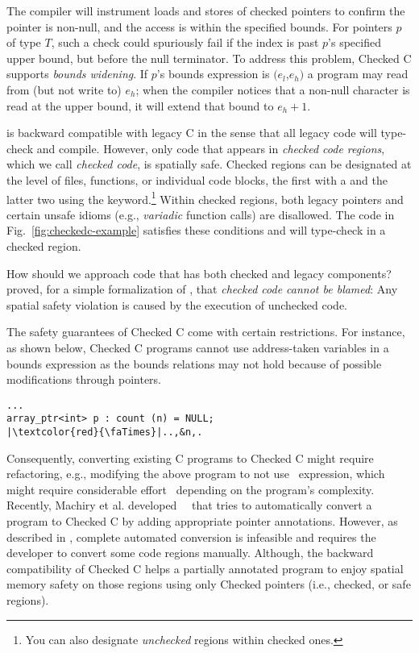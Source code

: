The \checkedc compiler will instrument loads and stores of checked
pointers to confirm the pointer is non-null, and the access is within
the specified bounds. For pointers $p$ of type
$T$\code{>}, such a check could spuriously fail if
the index is past $p$'s specified upper bound, but before the null
terminator. To address this problem, Checked C supports \emph{bounds
  widening}.
If $p$'s bounds expression is $(e_l$,$e_h)$ a program may read from (but not
write to) $e_h$; when the compiler notices that a non-null character
is read at the upper bound, it will extend that bound to $e_h+1$.

%
\checkedc is backward compatible with legacy C in the sense that all
legacy code will type-check and compile. However, only code that
appears in \emph{checked code regions}, which we call \emph{checked code},
is spatially safe. Checked regions can be designated at the level of
files, functions, or individual code blocks, the first with a
 and the latter two using the 
keyword.\footnote{You can also designate \emph{unchecked} regions
  within checked ones.}  Within checked regions, both
legacy pointers and certain unsafe idioms (e.g., \emph{variadic} function
calls) are disallowed. The code in Fig.~\ref{fig:checkedc-example}
satisfies these conditions and will type-check in a checked region.

How should we approach code that has both checked and legacy
components? \citet{li22checkedc} proved, for a simple
formalization of \checkedc, that \emph{checked code cannot be blamed}:
Any spatial safety violation is caused by the execution of unchecked
code. 

%
The safety guarantees of Checked C come with certain restrictions. For instance, as shown below, Checked C programs cannot use address-taken variables in a bounds expression as the bounds relations may not hold because of possible modifications through pointers.
\begin{verbatim}
...
array_ptr<int> p : count (n) = NULL;
|\textcolor{red}{\faTimes}|..,&n,.
\end{verbatim}
Consequently, converting existing C programs to Checked C might require refactoring, e.g., modifying the above program to not use~ expression, which might require considerable effort~\cite{duanrefactoring} depending on the program's complexity. 
Recently, Machiry et al. developed~\threec~\cite{machiry2022c} that tries to automatically convert a program to Checked C by adding appropriate pointer annotations.
However, as described in \threec, complete automated conversion is infeasible and requires the developer to convert some code regions manually.
Although, the backward compatibility of Checked C helps a partially annotated program to enjoy spatial memory safety on those regions using only Checked pointers (i.e., checked, or safe regions).

